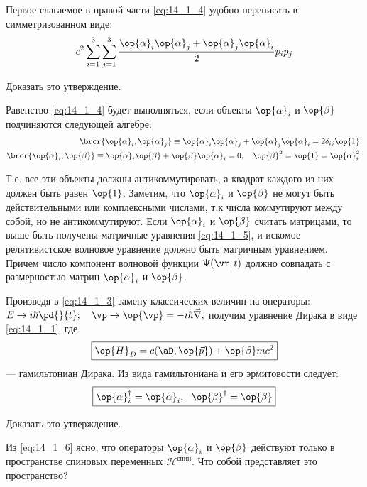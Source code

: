 Первое слагаемое в правой части \eqref{eq:14_1_4} удобно переписать в симметризованном виде:
$$
c^2 \sum_{i=1}^3 \sum_{j = 1}^3 \frac{ \op{\alpha}_i \op{\alpha}_j + \op{\alpha}_j \op{\alpha}_i }{2} p_i p_j
$$

\begin{excr}
Доказать это утверждение.
\end{excr}

Равенство \eqref{eq:14_1_4} будет выполняться, если объекты $\op{\alpha}_i$ и $\op{\beta}$ подчиняются следующей алгебре:
\begin{eqnarray}
\label{eq:14_1_5}
  \brcr{\op{\alpha}_i, \op{\alpha}_j } \equiv \op{\alpha}_i \op{\alpha}_j  + \op{\alpha}_j \op{\alpha}_i = 2 \delta_{ij} \op{1}; \nonumber \\
  \brcr{\op{\alpha}_i, \op{\beta} } \equiv \op{\alpha}_i \op{\beta} + \op{\beta} \op{\alpha}_i = 0;~~~\op{\beta}^2 = \op{1} = \op{\alpha}_i^2.
\end{eqnarray}

Т.е. все эти объекты должны антикоммутировать, а квадрат каждого из них должен быть равен $\op{1}$. Заметим, что $\op{\alpha}_i$ и $\op{\beta}$ не могут быть действительными или комплексными числами, т.к числа коммутируют между собой, но не антикоммутируют. Если $\op{\alpha}_i$ и $\op{\beta}$ считать матрицами, то выше быть получены матричные уравнения \eqref{eq:14_1_5}, и искомое релятивистское волновое уравнение должно быть матричным уравнением. Причем число компонент волновой функции $\mathsf{\Psi}(\vr, t)$ должно совпадать с размерностью матриц $\op{\alpha}_i$ и $\op{\beta}$. 

Произведя в \eqref{eq:14_1_3} замену классических величин на операторы:
$E \to i\hbar \pd{}{t};~~~\vp \to \op{\vp} = -i \hbar \vec{\nabla},$
получим уравнение Дирака в виде \eqref{eq:14_1_1}, где
\begin{equation}
\label{eq:14_1_6}
\boxed{\op{H}_D = c(\aD, \op{\vec{p}}) + \op{\beta} mc^2}
\end{equation}
--- гамильтониан Дирака. Из вида гамильтониана и его эрмитовости следует:
$$
\boxed{\op{\alpha}_i^\dag = \op{\alpha}_i,~~\op{\beta}^\dag = \op{\beta}}
$$

\begin{excr}
Доказать это утверждение.
\end{excr}

Из \eqref{eq:14_1_6} ясно, что операторы $\op{\alpha}_i$ и $\op{\beta}$ действуют только в пространстве спиновых переменных $\mathcal{H}^{\text{спин}}$. Что собой представляет это пространство?


